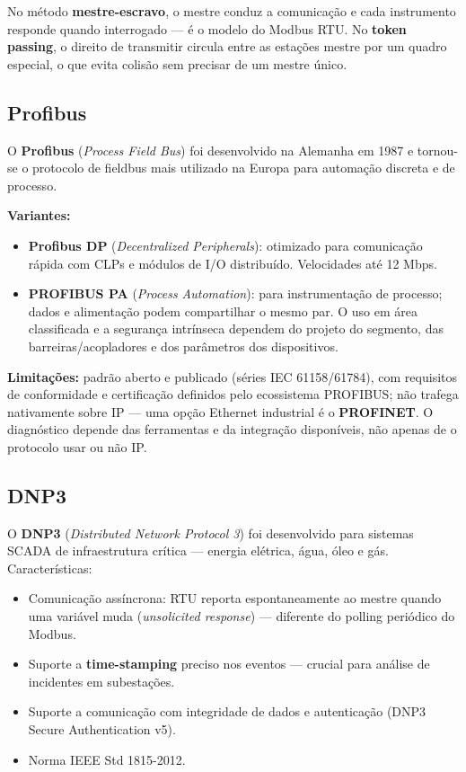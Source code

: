 No método \textbf{mestre-escravo}, o mestre conduz a comunicação e cada instrumento responde quando
interrogado --- é o modelo do Modbus RTU. No \textbf{token passing}, o direito de transmitir circula entre
as estações mestre por um quadro especial, o que evita colisão sem precisar de um mestre único.

\subsection{Profibus}\label{profibus}

O \textbf{Profibus} (\emph{Process Field Bus}) foi desenvolvido na Alemanha em 1987 e tornou-se o protocolo de fieldbus mais utilizado na Europa para automação discreta e de processo.

\textbf{Variantes:}

\begin{itemize}
\tightlist
\item
  \textbf{Profibus DP} (\emph{Decentralized Peripherals}): otimizado para comunicação rápida com CLPs e módulos de I/O distribuído. Velocidades até 12 Mbps.
\item
  \textbf{PROFIBUS PA} (\emph{Process Automation}): para instrumentação de processo; dados e alimentação podem compartilhar o mesmo par. O uso em área classificada e a segurança intrínseca dependem do projeto do segmento, das barreiras/acopladores e dos parâmetros dos dispositivos.
\end{itemize}

\textbf{Limitações:} padrão aberto e publicado (séries IEC 61158/61784), com requisitos de conformidade
e certificação definidos pelo ecossistema PROFIBUS; não trafega nativamente sobre IP --- uma opção
Ethernet industrial é o \textbf{PROFINET}. O diagnóstico depende das ferramentas e da integração
disponíveis, não apenas de o protocolo usar ou não IP.

\subsection{DNP3}\label{dnp3}

O \textbf{DNP3} (\emph{Distributed Network Protocol 3}) foi desenvolvido para sistemas SCADA de infraestrutura crítica --- energia elétrica, água, óleo e gás. Características:

\begin{itemize}
\tightlist
\item
  Comunicação assíncrona: RTU reporta espontaneamente ao mestre quando uma variável muda (\emph{unsolicited response}) --- diferente do polling periódico do Modbus.
\item
  Suporte a \textbf{time-stamping} preciso nos eventos --- crucial para análise de incidentes em subestações.
\item
  Suporte a comunicação com integridade de dados e autenticação (DNP3 Secure Authentication v5).
\item
  Norma IEEE Std 1815-2012.
\end{itemize}

